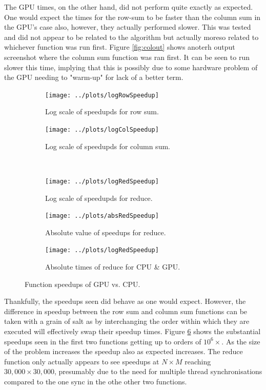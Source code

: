 \documentclass[12pt]{article}
\begin{document}
    The GPU times, on the other hand, did not perform quite exactly as expected. One would expect the times for the row-sum to be faster than the column sum in the GPU's case also, however, they actually performed slower. This was tested and did not appear to be related to the algorithm but actually moreso related to whichever function was run first. Figure \ref{fig:colout} shows anoterh output screenshot where the column sum function was ran first. It can be seen to run slower this time, implying that this is possibly due to some hardware problem of the GPU needing to "warm-up" for lack of a better term.
    \begin{figure}
        \centering
        \begin{subfigure}{0.48\textwidth}
            \centering
            \texttt{[image: ../plots/logRowSpeedup]}
            \caption{Log scale of speedupds for row sum.}
            \label{fig:rowSU}
        \end{subfigure}
        \begin{subfigure}{0.48\textwidth}
            \centering
            \texttt{[image: ../plots/logColSpeedup]}
            \caption{Log scale of speedupds for column sum.}
            \label{fig:colSU}
        \end{subfigure}\\ %
        \begin{subfigure}{0.32\textwidth}
            \centering
            \texttt{[image: ../plots/logRedSpeedup]}
            \caption{Log scale of speedupds for reduce.}
            \label{fig:redSU}
        \end{subfigure}
        \begin{subfigure}{0.32\textwidth}
            \centering
            \texttt{[image: ../plots/absRedSpeedup]}
            \caption{Absolute value of speedups for reduce.}
            \label{fig:redabsSU}
        \end{subfigure}
        \begin{subfigure}{0.32\textwidth}
            \centering
            \texttt{[image: ../plots/logRedSpeedup]}
            \caption{Absolute times of reduce for CPU \& GPU.}
            \label{fig:GPUvsCPU}
        \end{subfigure}
        \caption{Function speedups of GPU vs. CPU.}
        \label{fig:SU}
    \end{figure}
    Thankfully, the speedups seen did behave as one would expect. However, the difference in speedup between the row sum and column sum functions can be taken with a grain of salt as by interchanging the order within which they are executed will effectively swap their speedup times. Figure \ref{fig:SU} shows the substantial speedups seen in the first two functions getting up to orders of $10^6\times$. As the size of the problem increases the speedup also as expected increases. The reduce function only actually appears to see speedups at $N\times M$ reaching $30,000\times30,000$, presumably due to the need for multiple thread synchronisations compared to the one sync in the othe other two functions. 
\end{document}
